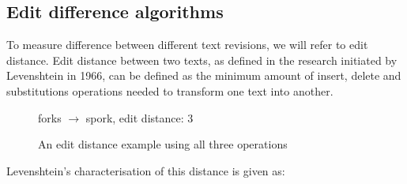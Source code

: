\documentclass[a4paper,11pt,twoside,notitlepage]{article}
\newcommand\CellText[2]{%
          \node[texto,left=of mat#1,anchor=east]
          at (mat#1.west)
          {\large #2};
        }
\newcommand\SlText[2]{%
          \node[texto,left=of mat#1,anchor=west,rotate=50]
          at ([xshift=1.5ex,yshift=1ex]mat#1.north)
          {\large #2};
        }
\begin{document}
        \subsection{Edit difference algorithms}
        To measure difference between different text revisions, we
        will refer to edit distance. Edit distance between two texts,
        as defined in the research initiated by Levenshtein in
        1966,\cite{Levenshtein1966} can be defined as the minimum
        amount of insert, delete and substitutions operations needed
        to transform one text into another.

        \begin{figure}[H]
          \centering
                  

          \vspace{3 mm}

          forks $\rightarrow$ spork, edit distance: 3
          
          \caption{An edit distance example using all three operations}
          \label{fig:fork-spork}
        \end{figure}

        Levenshtein's characterisation of this distance is given as:
        
\end{document}
